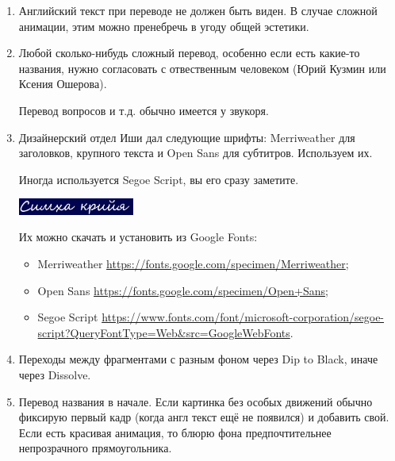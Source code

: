 \documentclass[
a4paper, %
12pt, %
article,
onecolumn, %
openany, %
]{memoir}
\begin{document}
\begin{enumerate}
\item Английский текст при переводе не должен быть виден. В случае сложной анимации, этим можно пренебречь в угоду общей эстетики.

\item Любой сколько-нибудь сложный перевод, особенно если есть какие-то названия, нужно согласовать с отвественным человеком (Юрий Кузмин или Ксения Ошерова).

	Перевод вопросов и т.д. обычно имеется у звукоря.

\item Дизайнерский отдел Иши дал следующие шрифты: Merriweather для заголовков, крупного текста и Open Sans для субтитров. Используем их.

    Иногда используется Segoe Script, вы его сразу заметите.

 \includegraphics[width=0.3\textwidth]{segoeScript}

    Их можно скачать и установить из Google Fonts:
    \begin{itemize}
        \item  Merriweather \href{https://fonts.google.com/specimen/Merriweather}{\small https://fonts.google.com/specimen/Merriweather};
        \item Open Sans \href{https://fonts.google.com/specimen/Open+Sans}{\small https://fonts.google.com/specimen/Open+Sans};
    \item Segoe Script \href{https://www.fonts.com/font/microsoft-corporation/segoe-script?QueryFontType=Web&src=GoogleWebFonts}{\small https://www.fonts.com/font/microsoft-corporation/segoe-script?QueryFontType=Web\&src=GoogleWebFonts}.
      \end{itemize}


\item Переходы между фрагментами с разным фоном через Dip to Black, иначе через Dissolve.

\item Перевод названия в начале. Если картинка без особых движений обычно фиксирую первый кадр (когда англ текст ещё не появился) и добавить свой. 
	Если есть красивая анимация, то блюрю фона предпочтительнее непрозрачного прямоугольника.


\end{enumerate}
\end{document}
